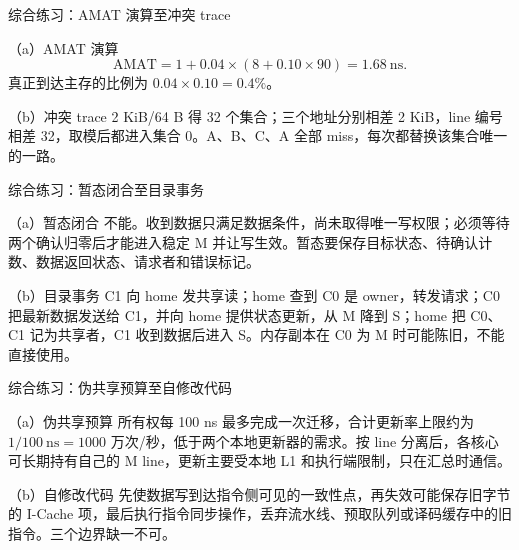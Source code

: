 \begin{chapteranswer}{综合练习：AMAT 演算至冲突 trace}
\begin{answersubproblem}{（a）AMAT 演算}
\[
\mathrm{AMAT}=1+0.04\times(8+0.10\times90)=1.68\ \mathrm{ns}.
\]
真正到达主存的比例为 $0.04\times0.10=0.4\%$。
\end{answersubproblem}
\begin{answersubproblem}{（b）冲突 trace}
2 KiB/64 B 得 32 个集合；三个地址分别相差 2 KiB，line 编号相差 32，取模后都进入集合 0。A、B、C、A 全部 miss，每次都替换该集合唯一的一路。
\end{answersubproblem}
\end{chapteranswer}

\begin{chapteranswer}{综合练习：暂态闭合至目录事务}
\begin{answersubproblem}{（a）暂态闭合}
不能。收到数据只满足数据条件，尚未取得唯一写权限；必须等待两个确认归零后才能进入稳定 M 并让写生效。暂态要保存目标状态、待确认计数、数据返回状态、请求者和错误标记。
\end{answersubproblem}
\begin{answersubproblem}{（b）目录事务}
C1 向 home 发共享读；home 查到 C0 是 owner，转发请求；C0 把最新数据发送给 C1，并向 home 提供状态更新，从 M 降到 S；home 把 C0、C1 记为共享者，C1 收到数据后进入 S。内存副本在 C0 为 M 时可能陈旧，不能直接使用。
\end{answersubproblem}
\end{chapteranswer}

\begin{chapteranswer}{综合练习：伪共享预算至自修改代码}
\begin{answersubproblem}{（a）伪共享预算}
所有权每 100 ns 最多完成一次迁移，合计更新率上限约为 $1/100\ \mathrm{ns}=1000$ 万次/秒，低于两个本地更新器的需求。按 line 分离后，各核心可长期持有自己的 M line，更新主要受本地 L1 和执行端限制，只在汇总时通信。
\end{answersubproblem}
\begin{answersubproblem}{（b）自修改代码}
先使数据写到达指令侧可见的一致性点，再失效可能保存旧字节的 I-Cache 项，最后执行指令同步操作，丢弃流水线、预取队列或译码缓存中的旧指令。三个边界缺一不可。
\end{answersubproblem}
\end{chapteranswer}


